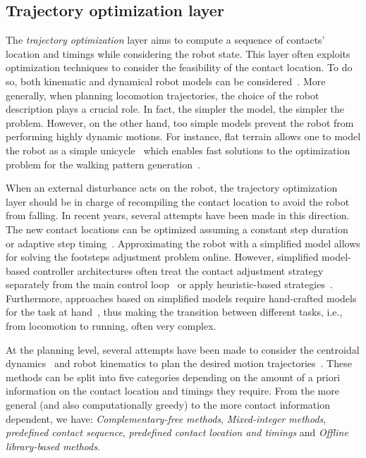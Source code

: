 \subsection{Trajectory optimization layer}
The \emph{trajectory optimization} layer aims to compute a sequence of contacts' location and timings while considering the robot state. This layer often exploits optimization techniques to
consider the feasibility of the contact location. To do so, both kinematic and dynamical robot models can be
considered~\citep{dai2014whole, Herzog2015TrajectoryControl}. More generally, when planning locomotion trajectories, the choice of the robot description plays a crucial role. In fact, the simpler the model, the simpler the problem. However, on the other hand, too simple models prevent the robot from performing highly dynamic motions. For instance, flat terrain allows one to model the robot as a simple
unicycle~\citep{PascalHandbook,flavigne2010reactive} which enables fast solutions to the optimization
problem for the walking pattern generation~\citep{8594277}.
\par
When an external disturbance acts on the robot, the trajectory optimization layer should be in charge
of recompiling the contact location to avoid the robot from falling.
In recent years, several attempts have been made in this direction.
The new contact locations can be optimized assuming a constant step duration~\citep{Feng2016RobustOptimization,Shafiee-Ashtiani2017a,Stephens2010PushJoints} or adaptive step timing~\citep{Khadiv2016StepGaits, Shafiee2019OnlineRobots, Griffin2017WalkingAtlas,Scianca2020MPCFeasibility}.
Approximating the robot with a simplified model allows for solving the footsteps adjustment problem
online. However, simplified model-based controller architectures often treat the
contact adjustment strategy separately from the main control loop~\citep{Shafiee2019OnlineRobots,Mesesan2021OnlineLocomotion,Griffin2016DisturbanceRecovery} or apply heuristic-based strategies~\citep{DiCarlo2018DynamicControl}.
Furthermore, approaches based on simplified models require hand-crafted models for the task at hand~\citep{Kajita2001,Poulakakis2009TheHopper,Englsberger2015}, thus making the transition between different tasks, i.e., from locomotion to running, often very complex.
\par
At the planning level, several attempts have been made to consider the centroidal dynamics~\citep{Orin2013} and robot kinematics to plan the desired motion trajectories~\citep{Herzog2015TrajectoryControl,Fernbach2018CROC:Problem,Dafarra2020Whole-BodyApproach,Dafarra2022DynamicLocomotion,dai2014whole}.
These methods can be split into five categories depending on the amount of a priori information on the
contact location and timings they require. From the more general (and also computationally greedy) to the more contact information dependent, we have:
\emph{Complementary-free methods}, \emph{Mixed-integer methods}, \emph{predefined contact sequence}, \emph{predefined contact location and timings}  and \emph{Offline library-based methods}.

